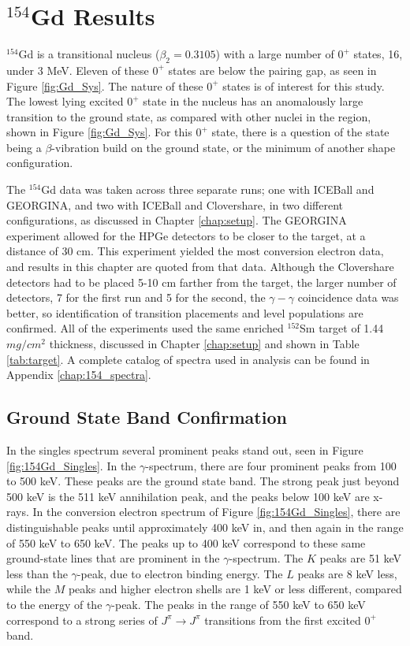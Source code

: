 \chapter{$^{154}$Gd Results}
\label{chap:154Gd}

$^{154}$Gd is a transitional nucleus ($\beta_2=0.3105$) with a large number of $0^+$ states, 16, under 3 MeV. Eleven of these $0^+$ states are below the pairing gap, as seen in Figure \ref{fig:Gd_Sys}. The nature of these $0^+$ states is of interest for this study. The lowest lying excited $0^+$ state in the nucleus has an anomalously large transition to the ground state, as compared with other nuclei in the region, shown in Figure \ref{fig:Gd_Sys}. For this $0^+$ state, there is a question of the state being a $\beta$-vibration build on the ground state, or the minimum of another shape configuration.

\afterpage{\clearpage}

The $^{154}$Gd data was taken across three separate runs; one with ICEBall and GEORGINA, and two with ICEBall and Clovershare, in two different configurations, as discussed in Chapter \ref{chap:setup}. The GEORGINA experiment allowed for the HPGe detectors to be closer to the target, at a distance of 30 cm. This experiment yielded the most conversion electron data, and results in this chapter are quoted from that data. Although the Clovershare detectors had to be placed 5-10 cm farther from the target, the larger number of detectors, 7 for the first run and 5 for the second, the $\gamma-\gamma$ coincidence data was better, so identification of transition placements and level populations are confirmed. All of the experiments used the same enriched $^{152}$Sm target of 1.44 $mg/cm^2$ thickness, discussed in Chapter \ref{chap:setup} and shown in Table \ref{tab:target}. A complete catalog of spectra used in analysis can be found in Appendix \ref{chap:154_spectra}.

\section{Ground State Band Confirmation}
\label{sec:154GS_Confirm}

In the singles spectrum several prominent peaks stand out, seen in Figure \ref{fig:154Gd_Singles}. In the $\gamma$-spectrum, there are four prominent peaks from 100 to 500 keV. These peaks are the ground state band. The strong peak just beyond 500 keV is the 511 keV annihilation peak, and the peaks below 100 keV are x-rays. In the conversion electron spectrum of Figure \ref{fig:154Gd_Singles}, there are distinguishable peaks until approximately 400 keV in, and then again in the range of 550 keV to 650 keV. The peaks up to 400 keV correspond to these same ground-state lines that are prominent in the $\gamma$-spectrum. The $K$ peaks are 51 keV less than the $\gamma$-peak, due to electron binding energy. The $L$ peaks are 8 keV less, while the $M$ peaks and higher electron shells are 1 keV or less different, compared to the energy of the $\gamma$-peak. The peaks in the range of 550 keV to 650 keV correspond to a strong series of $J^{\pi}\rightarrow J^{\pi}$ transitions from the first excited $0^+$ band.

